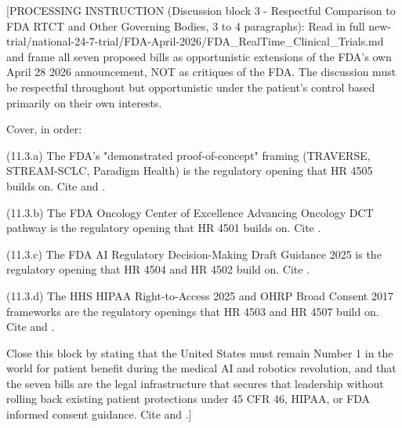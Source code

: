 [PROCESSING INSTRUCTION (Discussion block 3 - Respectful Comparison
to FDA RTCT and Other Governing Bodies, 3 to 4 paragraphs): Read in
full new-trial/national-24-7-trial/FDA-April-2026/FDA\_RealTime\_Clinical\_Trials.md
and frame all seven proposed bills as opportunistic extensions of
the FDA's own April 28 2026 announcement, NOT as critiques of the
FDA. The discussion must be respectful throughout but opportunistic
under the patient's control based primarily on their own interests.

Cover, in order:

(11.3.a) The FDA's "demonstrated proof-of-concept" framing (TRAVERSE,
STREAM-SCLC, Paradigm Health) is the regulatory opening that HR
4505 builds on. Cite \cite{fda_rtct_press_2026} and
\cite{fda_dhts_drug_development_2026}.

(11.3.b) The FDA Oncology Center of Excellence Advancing Oncology
DCT pathway is the regulatory opening that HR 4501 builds on. Cite
\cite{fda_oce_advancing_oncology_dct_2024}.

(11.3.c) The FDA AI Regulatory Decision-Making Draft Guidance 2025
is the regulatory opening that HR 4504 and HR 4502 build on. Cite
\cite{fda_ai_regulatory_decision_draft_2025}.

(11.3.d) The HHS HIPAA Right-to-Access 2025 and OHRP Broad Consent
2017 frameworks are the regulatory openings that HR 4503 and HR 4507
build on. Cite \cite{hhs_right_to_access_2025} and
\cite{ohrp_broad_consent_attachment_c_2017}.

Close this block by stating that the United States must remain
Number 1 in the world for patient benefit during the medical AI and
robotics revolution, and that the seven bills are the legal
infrastructure that secures that leadership without rolling back
existing patient protections under 45 CFR 46, HIPAA, or FDA informed
consent guidance. Cite \cite{hhs_45cfr46_protection_human_subjects}
and \cite{fda_informed_consent_guidance_2023}.]
